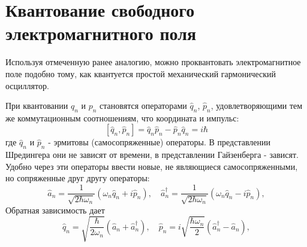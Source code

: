 \section{Квантование свободного электромагнитного поля}
\label{Ch1_quantumemf}
Используя отмеченную ранее аналогию, можно проквантовать
электромагнитное поле подобно тому, как квантуется простой
механический гармонический осциллятор. 

При квантовании $q_n$ и $p_n$ становятся операторами $\hat{q}_n$,
$\hat{p}_n$, удовлетворяющими тем же коммутационным соотношениям, 
что координата и импульс: 
\begin{equation}
\left[\hat{q}_n, \hat{p}_n\right] = \hat{q}_n\hat{p}_n -
\hat{p}_n \hat{q}_n = i\hbar
\label{eqCh1_comut}
\end{equation}
где $\hat{q}_n$ и $\hat{p}_n$ - эрмитовы (самосопряженные)
операторы. В представлении Шредингера они не зависят от
времени, в представлении Гайзенберга - зависят. Удобно через
эти операторы ввести новые, не являющиеся самосопряженными, но
сопряженные друг другу операторы: 
\begin{equation}
\hat{a}_n = \frac{1}{\sqrt{2 \hbar \omega_n}}
\left( \omega_n \hat{q}_n + i \hat{p}_n\right),
\quad
\hat{a}_n^{\dag} = \frac{1}{\sqrt{2 \hbar \omega_n}}
\left( \omega_n \hat{q}_n - i \hat{p}_n\right),
\label{eqCh1_aadef}
\end{equation}
Обратная зависимость дает
\begin{equation}
\hat{q}_n = \sqrt{\frac{\hbar}{2 \omega_n}}
\left(\hat{a}_n + \hat{a}_n^{\dag}\right),
\quad
\hat{p}_n = i \sqrt{\frac{\hbar \omega_n}{2}}
\left(\hat{a}_n^{\dag} - \hat{a}_n\right),
\label{eqCh1_qpdef}
\end{equation}


